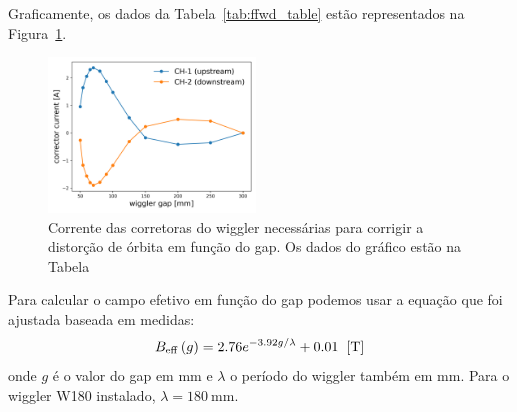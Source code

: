 \documentclass[a4paper,
               keeplastbox,   %
               ]{jacow}
\begin{document}
Graficamente, os dados da Tabela~\ref{tab:ffwd_table} estão representados na Figura~\ref{fig:ffwd_table}.
\begin{figure}[!h]
    \centering
    \includegraphics[width=0.49\textwidth]{wiggler_ffwd_table_new.png}
    \caption{Corrente das corretoras do wiggler necessárias para corrigir a distorção de órbita em função do gap. Os dados do gráfico estão na Tabela}
    \label{fig:ffwd_table}
\end{figure}

Para calcular o campo efetivo em função do gap podemos usar a equação que foi ajustada baseada em medidas:
\begin{equation}
    B_{\mathrm{eff}}\left(g\right) = 2.76 e^{-3.92 g\slash \lambda} + 0.01 \hspace{0.2cm} \mathrm{[T]}
\end{equation}
onde $g$ é o valor do gap em mm e $\lambda$ o período do wiggler também em mm. Para o wiggler W180 instalado, $\lambda = \SI{180}{\milli\meter}$.
\end{document}
